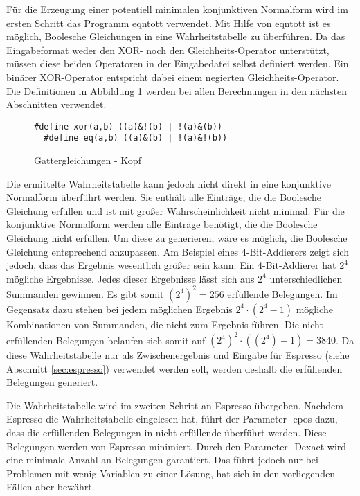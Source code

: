 Für die Erzeugung einer potentiell minimalen konjunktiven Normalform wird im ersten Schritt das Programm eqntott verwendet. Mit Hilfe von eqntott
ist es möglich, Boolesche Gleichungen in eine Wahrheitstabelle zu überführen. Da das Eingabeformat weder den XOR- noch den Gleichheits-Operator unterstützt,
müssen diese beiden Operatoren in der Eingabedatei selbst definiert werden. Ein binärer XOR-Operator entspricht dabei einem negierten Gleichheits-Operator.
Die Definitionen in Abbildung \ref{fig:gatter_equations_head} werden bei allen Berechnungen in den nächsten Abschnitten verwendet.
\begin{figure}[!h]
  \centering
  \begin{minipage}[c]{14.5cm}
    \begin{lstlisting}[]
  #define xor(a,b) ((a)&!(b) | !(a)&(b))
  #define eq(a,b) ((a)&(b) | !(a)&!(b))
    \end{lstlisting}
  \end{minipage}
  \caption{Gattergleichungen - Kopf}
  \label{fig:gatter_equations_head}
\end{figure}

Die ermittelte Wahrheitstabelle kann jedoch nicht direkt in eine konjunktive Normalform überführt werden. Sie enthält alle Einträge, die die Boolesche Gleichung erfüllen
und ist mit großer Wahrscheinlichkeit nicht minimal. Für die konjunktive Normalform werden alle Einträge benötigt, die die Boolesche Gleichung nicht erfüllen. Um diese zu
generieren, wäre es möglich, die Boolesche Gleichung entsprechend anzupassen. Am Beispiel eines 4-Bit-Addierers zeigt sich jedoch, dass das Ergebnis wesentlich größer sein kann.
Ein 4-Bit-Addierer hat $2^4$ mögliche Ergebnisse. Jedes dieser Ergebnisse lässt sich aus $2^4$ unterschiedlichen Summanden gewinnen. Es gibt somit $(2^4)^2 = 256$
erfüllende Belegungen. Im Gegensatz dazu stehen bei jedem möglichen Ergebnis $2^4 \cdot (2^4-1)$ mögliche Kombinationen von Summanden, die nicht zum Ergebnis führen.
Die nicht erfüllenden Belegungen belaufen sich somit auf $(2^4)^2 \cdot ((2^4)-1) = 3840$. Da diese Wahrheitstabelle nur als Zwischenergebnis und Eingabe für
Espresso (siehe Abschnitt \ref{sec:espresso}) verwendet werden soll, werden deshalb die erfüllenden Belegungen generiert.

Die Wahrheitstabelle wird im zweiten Schritt an Espresso übergeben. Nachdem Espresso die Wahrheitstabelle eingelesen hat, führt der Parameter -epos dazu,
dass die erfüllenden Belegungen in nicht-erfüllende überführt werden. Diese Belegungen werden von Espresso minimiert. Durch den Parameter -Dexact wird
eine minimale Anzahl an Belegungen garantiert. Das führt jedoch nur bei Problemen mit wenig Variablen zu einer Lösung, hat sich in den vorliegenden
Fällen aber bewährt.

